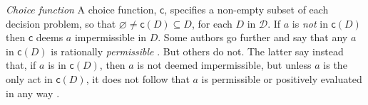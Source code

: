 \documentclass[a4paper]{article}
\newcommand\D{\mathcal{D}}
\renewcommand\c{\mathsf{c}} %
\renewcommand{\emptyset}{\varnothing}
\newenvironment{CCM rewritten}
{\begingroup\color{blue}} %
{\endgroup}              %
\begin{document}
{
\emph{Choice function } A choice function, $\c$, specifies a non-empty subset of each decision problem, so that $\emptyset \neq \c(D) \subseteq D$, for each $D$ in $\D$. If $a$ is \textit{not} in $\c(D)$ then $\c$ deems $a$ impermissible in $D$. Some authors go further and say that any $a$ in $\c(D)$ is rationally \textit{permissible} \citep[e.g.,][]{moss2015tse}. But others do not. The latter say instead that, if $a$ is in $\c(D)$, then $a$ is not deemed impermissible, but unless $a$ is the only act in $\c(D)$, it does not follow that $a$ is permissible or positively evaluated in any way \citep[e.g.,][]{debock2019iar}.}











\end{document}
